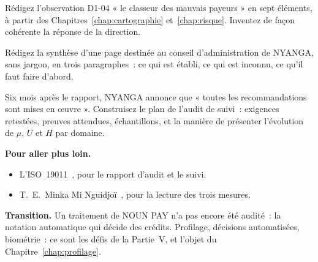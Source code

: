 \begin{boxexo}[title={\ding{45}\quad Exercice~13.2. Une observation \niveaumoyen}]
Rédigez l'observation D1-04 « le classeur des mauvais payeurs » en sept
éléments, à partir des Chapitres~\ref{chap:cartographie} et~\ref{chap:risque}.
Inventez de façon cohérente la réponse de la direction.
\end{boxexo}

\begin{boxexo}[title={\ding{45}\quad Exercice~13.3. La page du conseil \niveaumoyen}]
Rédigez la synthèse d'une page destinée au conseil d'administration de
NYANGA, sans jargon, en trois paragraphes~: ce qui est établi, ce qui est
inconnu, ce qu'il faut faire d'abord.
\end{boxexo}

\begin{boxexo}[title={\ding{45}\quad Exercice~13.4. L'audit de suivi \niveauexpert}]
Six mois après le rapport, NYANGA annonce que « toutes les recommandations
sont mises en œuvre ». Construisez le plan de l'audit de suivi~: exigences
retestées, preuves attendues, échantillons, et la manière de présenter
l'évolution de $\mu$, $U$ et $H$ par domaine.
\end{boxexo}

\bigskip

\begin{boxinfo}
\textbf{Pour aller plus loin.}
\begin{itemize}
    \item L'ISO~19011~\cite{iso19011_2018}, pour le rapport d'audit et le
          suivi.
    \item T.~E.~Minka Mi Nguidjoï~\cite{minka2026nek}, pour la lecture des
          trois mesures.
\end{itemize}
\end{boxinfo}

\begin{boxinfo}
\textbf{Transition.} Un traitement de NOUN PAY n'a pas encore été audité~:
la notation automatique qui décide des crédits. Profilage, décisions
automatisées, biométrie~: ce sont les défis de la Partie~V, et l'objet du
Chapitre~\ref{chap:profilage}.
\end{boxinfo}
